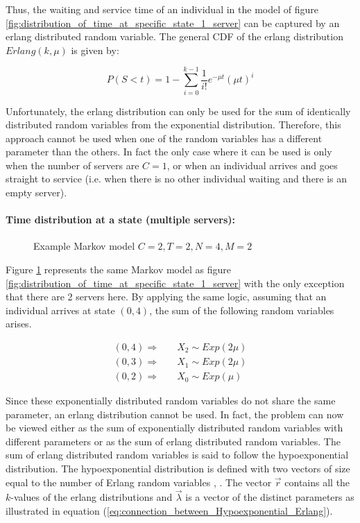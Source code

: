 Thus, the waiting and service time of an individual in the model of figure 
\ref{fig:distribution_of_time_at_specific_state_1_server} can be captured by an 
erlang distributed random variable. 
The general CDF of the erlang distribution \(Erlang(k, \mu)\) is given by:

\begin{equation} \label{eq:cdf_erlang}
    P(S < t) = 1 - \sum_{i=0}^{k-1} \frac{1}{i!} e^{-\mu t} (\mu t)^i
\end{equation}

Unfortunately, the erlang distribution can only be used for the sum of 
identically distributed random variables from the exponential distribution. 
Therefore, this approach cannot be used when one of the random variables has a 
different parameter than the others. 
In fact the only case where it can be used is only when the number of servers 
are \(C=1\), or when an individual arrives and goes straight to service 
(i.e. when there is no other individual waiting and there is an empty server).


\paragraph{Time distribution at a state (multiple servers):}

\begin{figure}[h]
    \centering
    \scalebox{0.75}{}
    \caption{Example Markov model \(C=2, T=2, N=4, M=2\)}
    \label{fig:distribution_of_time_at_specific_state_2_servers}
\end{figure}

Figure \ref{fig:distribution_of_time_at_specific_state_2_servers} represents the 
same Markov model as figure 
\ref{fig:distribution_of_time_at_specific_state_1_server} with the only 
exception that there are 2 servers here. 
By applying the same logic, assuming that an individual arrives at state 
\((0,4)\), the sum of the following random variables arises.

\begin{align}
    (0,4) \Rightarrow \quad & X_2 \sim Exp(2\mu) \nonumber \\
    (0,3) \Rightarrow \quad & X_1 \sim Exp(2\mu) \\
    (0,2) \Rightarrow \quad & X_0 \sim Exp(\mu) \nonumber
\end{align}

Since these exponentially distributed random variables do not share the same 
parameter, an erlang distribution cannot be used. 
In fact, the problem can now be viewed either as the sum of exponentially 
distributed random variables with different parameters or as the sum of 
erlang distributed random variables.
The sum of erlang distributed random variables is said to follow the 
hypoexponential distribution. 
The hypoexponential distribution is defined with two vectors of size equal
to the number of Erlang random variables \cite{Akkouchi2008}, \cite{Smaili2013}. 
The vector \(\vec{r}\) contains all the \(k\)-values of the erlang distributions 
and \(\vec{\lambda}\) is a vector of the distinct parameters as illustrated in
equation (\ref{eq:connection_between_Hypoexponential_Erlang}).

